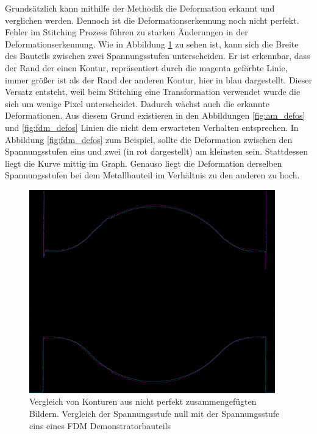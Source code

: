 Grundsätzlich kann mithilfe der Methodik die Deformation erkannt und verglichen 
werden.
Dennoch ist die Deformationserkennung noch nicht perfekt. 
Fehler im Stitching Prozess führen zu starken Änderungen in der Deformationserkennung. 
Wie in Abbildung \ref{fig:errors} zu sehen ist, kann sich die Breite des Bauteils 
zwischen zwei Spannungsstufen unterscheiden. Er ist erkennbar, dass der Rand der einen 
Kontur, repräsentiert durch die magenta gefärbte Linie, immer größer ist als 
der Rand der anderen Kontur, hier in blau dargestellt.
Dieser Versatz entsteht, weil beim Stitching eine Transformation verwendet wurde die sich 
um wenige Pixel unterscheidet. Dadurch wächst auch die erkannte Deformationen.
Aus diesem Grund existieren in den Abbildungen \ref{fig:am_defos} und \ref{fig:fdm_defos}
Linien die nicht dem erwarteten Verhalten entsprechen. 
In Abbildung \ref{fig:fdm_defos} zum Beispiel, sollte die Deformation zwischen den 
Spannungsstufen eins und zwei 
(in rot dargestellt) am kleinsten sein. Stattdessen liegt die Kurve mittig im Graph.
Genauso liegt die Deformation derselben 
Spannungsstufen bei dem Metallbauteil im Verhältnis zu den anderen zu hoch. 

\begin{figure}[H]
  \centering
  \includegraphics[width=0.95\textwidth]{images/FDM_sp0_stitched_FDM_sp1_stitched_0_0.png}
  \caption{Vergleich von Konturen aus nicht perfekt zusammengefügten Bildern. 
  Vergleich der Spannungsstufe null mit der Spannungsstufe eins eines FDM Demonstratorbauteils}
  \label{fig:errors}
\end{figure}
